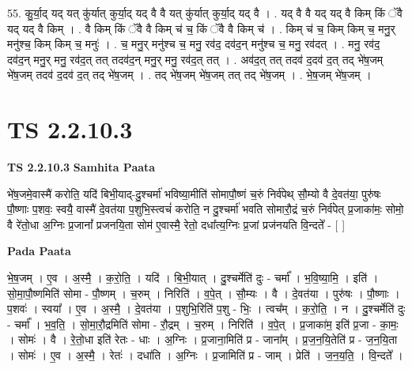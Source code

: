 \documentclass[17pt]{extarticle}
\begin{document}
55. कु॒र्या॒द् यद् यत् कु॑र्यात् कुर्या॒द् यद् वै वै यत् कु॑र्यात् कुर्या॒द् यद् वै । . यद् वै वै यद् यद् वै किम् किं ॅवै यद् यद् वै किम् । . वै किम् किं ॅवै वै किम् च॑ च॒ किं ॅवै वै किम् च॑ । . किम् च॑ च॒ किम् किम् च॒ मनु॒र् मनु॑श्च॒ किम् किम् च॒ मनुः॑ । . च॒ मनु॒र् मनु॑श्च च॒ मनु॒ रव॑द॒ दव॑द॒न् मनु॑श्च च॒ मनु॒ रव॑दत् । . मनु॒ रव॑द॒ दव॑द॒न् मनु॒र् मनु॒ रव॑द॒त् तत् तदव॑द॒न् मनु॒र् मनु॒ रव॑द॒त् तत् । . अव॑द॒त् तत् तदव॑ द॒दव॑ द॒त् तद् भे॑ष॒जम् भे॑ष॒जम् तदव॑ द॒दव॑ द॒त् तद् भे॑ष॒जम् । . तद् भे॑ष॒जम् भे॑ष॒जम् तत् तद् भे॑ष॒जम् । . भे॒ष॒जम् भे॑ष॒जम् । \newline
\pagebreak
{}
\section*{ TS 2.2.10.3 }

\textbf{TS 2.2.10.3 } \newline
\textbf{Samhita Paata} \newline

भे॑ष॒जमे॒वास्मै॑ करोति॒ यदि॑ बिभी॒याद्-दु॒श्चर्मा॑ भविष्या॒मीति॑ सोमापौ॒ष्णं च॒रुं निर्व॑पेथ् सौ॒म्यो वै दे॒वत॑या॒ पुरु॑षः पौ॒ष्णाः प॒शवः॒ स्वयै॒ वास्मै॑ दे॒वत॑या प॒शुभि॒स्त्वचं॑ करोति॒ न दु॒श्चर्मा॑ भवति सोमारौ॒द्रं च॒रुं निर्व॑पेत् प्र॒जाका॑मः॒ सोमो॒ वै रे॑तो॒धा अ॒ग्निः प्र॒जानां᳚ प्रजनयि॒ता सोम॑ ए॒वास्मै॒ रेतो॒ दधा᳚त्य॒ग्निः प्र॒जां प्रज॑नयति वि॒न्दते᳚ - [  ] \newline

\textbf{Pada Paata} \newline

भे॒ष॒जम् । ए॒व । अ॒स्मै॒ । क॒रो॒ति॒ । यदि॑ । बि॒भी॒यात् । दु॒श्चर्मेति॑ दुः - चर्मा᳚ । भ॒वि॒ष्या॒मि॒ । इति॑ । सो॒मा॒पौ॒ष्णमिति॑ सोमा - पौ॒ष्णम् । च॒रुम् । निरिति॑ । व॒पे॒त् । सौ॒म्यः । वै । दे॒वत॑या । पुरु॑षः । पौ॒ष्णाः । प॒शवः॑ । स्वया᳚ । ए॒व । अ॒स्मै॒ । दे॒वत॑या । प॒शुभि॒रिति॑ प॒शु - भिः॒ । त्वच᳚म् । क॒रो॒ति॒ । न । दु॒श्चर्मेति॑ दुः - चर्मा᳚ । भ॒व॒ति॒ । सो॒मा॒रौ॒द्रमिति॑ सोमा - रौ॒द्रम् । च॒रुम् । निरिति॑ । व॒पे॒त् । प्र॒जाका॑म॒ इति॑ प्र॒जा - का॒मः॒ । सोमः॑ । वै । रे॒तो॒धा इति॑ रेतः - धाः । अ॒ग्निः । प्र॒जाना॒मिति॑ प्र - जाना᳚म् । प्र॒ज॒न॒यि॒तेति॑ प्र - ज॒न॒यि॒ता । सोमः॑ । ए॒व । अ॒स्मै॒ । रेतः॑ । दधा॑ति । अ॒ग्निः । प्र॒जामिति॑ प्र - जाम् । प्रेति॑ । ज॒न॒य॒ति॒ । वि॒न्दते᳚ ।  \newline
\end{document}
